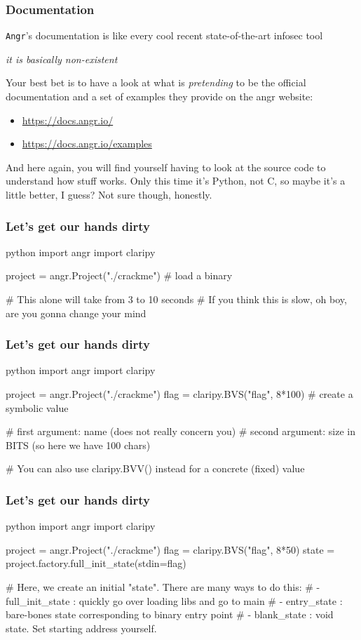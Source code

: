 \documentclass[aspectratio=169]{beamer}
\begin{document}
\begin{frame}[fragile]
	\frametitle{Documentation}
	\texttt{Angr}'s documentation is like every cool recent state-of-the-art infosec tool
	\pause
	\vspace{1em}
	\begin{center}
		\Large
		\emph{it is basically non-existent}
	\end{center}
	\pause
	Your best bet is to have a look at what is \emph{pretending} to be the official
	documentation and a set of examples they provide on the angr website:
	\begin{itemize}
		\item \href{https://docs.angr.io/}{https://docs.angr.io/}
		\item \href{https://docs.angr.io/examples}{https://docs.angr.io/examples}
	\end{itemize}
	\pause
	And here again, you will find yourself having to look at the source code to understand how stuff works. Only this time it's Python, not C, so maybe it's a little better, I guess? Not sure though, honestly.
\end{frame}


\begin{frame}[fragile]
	\frametitle{Let's get our hands dirty}
	\begin{codebox}{python}
import angr
import claripy

project = angr.Project("./crackme") # load a binary

# This alone will take from 3 to 10 seconds
# If you think this is slow, oh boy, are you gonna change your mind\end{codebox}
\end{frame}


\begin{frame}[fragile]
	\frametitle{Let's get our hands dirty}
	\begin{codebox}{python}
import angr
import claripy

project = angr.Project("./crackme")
flag = claripy.BVS("flag", 8*100) # create a symbolic value

# first argument: name (does not really concern you)
# second argument: size in BITS (so here we have 100 chars)

# You can also use claripy.BVV() instead for a concrete (fixed) value \end{codebox}
\end{frame}


\begin{frame}[fragile]
	\frametitle{Let's get our hands dirty}
	\begin{codebox}{python}
import angr
import claripy

project = angr.Project("./crackme")
flag = claripy.BVS("flag", 8*50)
state = project.factory.full_init_state(stdin=flag)

# Here, we create an initial "state". There are many ways to do this:
# - full_init_state : quickly go over loading libs and go to main
# - entry_state     : bare-bones state corresponding to binary entry point
# - blank_state     : void state. Set starting address yourself.\end{codebox}
\end{frame}
\end{document}
